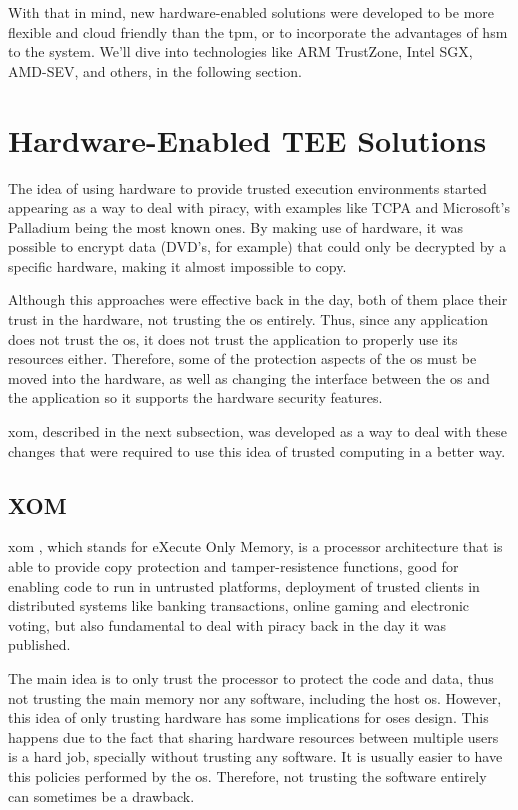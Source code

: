 With that in mind, new hardware-enabled solutions were developed to be more flexible and cloud friendly than the \gls{tpm}, or to incorporate the advantages of \gls{hsm} to the system. We'll dive into technologies like ARM TrustZone, Intel SGX, AMD-SEV, and others, in the following section.




\section{Hardware-Enabled TEE Solutions}
\label{sec:hardwareTEEs}

The idea of using hardware to provide trusted execution environments started appearing as a way to deal with piracy, with examples like TCPA \cite{tcpaPaper} and Microsoft's Palladium being the most known ones. By making use of hardware, it was possible to encrypt data (DVD's, for example) that could only be decrypted by a specific hardware, making it almost impossible to copy. 

Although this approaches were effective back in the day, both of them place their trust in the hardware, not trusting the \gls{os} entirely. 
Thus, since any application does not trust the \gls{os}, it does not trust the application to properly use its resources either. Therefore, some of the protection aspects of the \gls{os} must be moved into the hardware, as well as changing the interface between the \gls{os} and the application so it supports the hardware security features. 

\gls{xom}, described in the next subsection, was developed as a way to deal with these changes that were required to use this idea of trusted computing in a better way.

\subsection{XOM}
\label{ssec:xom}

\gls{xom} \cite{xomPaper}, which stands for eXecute Only Memory, is a processor architecture that is able to provide copy protection and tamper-resistence functions, 
good for enabling code to run in untrusted platforms, deployment of trusted clients in distributed systems like banking transactions, online gaming and electronic voting, but also fundamental to deal with piracy back in the day it was published. 

The main idea is to only trust the processor to protect the code and data, thus not trusting the main memory nor any software, including the host \gls{os}.
However, this idea of only trusting hardware has some implications for \gls{os}es design. This happens due to the fact that sharing hardware resources between multiple users is a hard job, specially without trusting any software. It is usually easier to have this policies performed by the \gls{os}. Therefore, not trusting the software entirely can sometimes be a drawback.  

